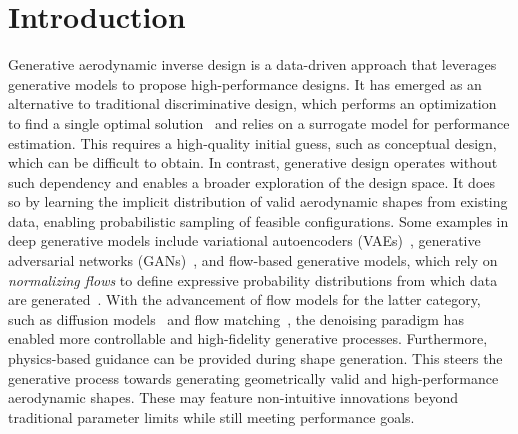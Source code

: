 \section{Introduction}
\label{ch7:sect:introduction}

Generative aerodynamic inverse design is a data-driven approach that leverages generative models to propose high-performance designs. It has emerged as an alternative to traditional discriminative design, which  performs an optimization to find a single optimal solution~\cite{aa.Li2022b, aa.Lyu2024} and relies on a surrogate model for performance estimation. This requires a high-quality initial guess, such as conceptual design, which can be difficult to obtain. In contrast, generative design operates without such dependency and enables a broader exploration of the design space. It does so by learning the implicit distribution of valid aerodynamic shapes from existing data, enabling probabilistic sampling of feasible configurations. Some examples in deep generative models include variational autoencoders (VAEs)~\cite{ai.Kingma2014}, generative adversarial networks (GANs)~\cite{ai.Goodfellow2020}, and flow-based generative models, which rely on \textit{normalizing flows} to define expressive probability distributions from which data are generated~\cite{aa.Papamakarios2021}. With the advancement of flow models for the latter category, such as diffusion models~\cite{ai.Ho2020, ai.Song2021c} and flow matching~\cite{ai.Lipman2022}, the denoising paradigm has enabled more controllable and high-fidelity generative processes. Furthermore, physics-based guidance can be provided during shape generation. This steers the generative process towards generating geometrically valid and high-performance aerodynamic shapes. These may feature non-intuitive innovations beyond traditional parameter limits while still meeting performance goals.

